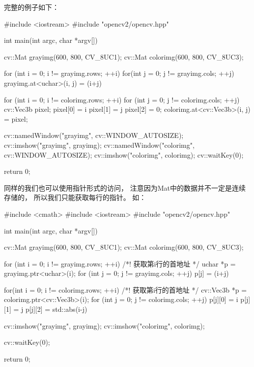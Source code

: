 完整的例子如下：
\begin{cppcode}
  #include <iostream>
  #include "opencv2/opencv.hpp"

  int main(int argc, char *argv[]){
    cv::Mat grayimg(600, 800, CV_8UC1);
    cv::Mat colorimg(600, 800, CV_8UC3);

    for (int i = 0; i != grayimg.rows; ++i){
      for(int j = 0; j != grayimg.cols; ++j){
        grayimg.at<uchar>(i, j) = (i+j)%
      }
    }

    for (int i = 0; i != colorimg.rows; ++i){
      for (int j = 0; j != colorimg.cols; ++j){
        cv::Vec3b pixel;
        pixel[0] = i %
        pixel[1] = j %
        pixel[2] = 0;     
        colorimg.at<cv::Vec3b>(i, j) = pixel;
      }
    }

    cv::namedWindow("grayimg", cv::WINDOW_AUTOSIZE);
    cv::imshow("grayimg", grayimg);
    cv::namedWindow("colorimg", cv::WINDOW_AUTOSIZE);
    cv::imshow("colorimg", colorimg);
    cv::waitKey(0);
    
    return 0;
  }
\end{cppcode}
同样的我们也可以使用指针形式的访问，%
注意因为Mat中的数据并不一定是连续存储的，%
所以我们只能获取每行的指针。%
如：
\begin{cppcode}
  #include <cmath>
  #include <iostream>
  #include "opencv2/opencv.hpp"
  
  int main(int argc, char *argv[]){
    cv::Mat grayimg(600, 800, CV_8UC1);
    cv::Mat colorimg(600, 800, CV_8UC3);
    
    for (int i = 0; i != grayimg.rows; ++i){
      /*! 获取第i行的首地址 */
      uchar *p = grayimg.ptr<uchar>(i);
      for (int j = 0; j != grayimg.cols; ++j){
        p[j] = (i+j)%
      }
    }

    for(int i = 0; i != colorimg.rows; ++i){
      /*! 获取第i行的首地址 */
      cv::Vec3b *p = colorimg.ptr<cv::Vec3b>(i);
      for (int j = 0; j != colorimg.cols; ++j){
        p[j][0] = i %
        p[j][1] = j %
        p[j][2] = std::abs(i-j) %
      }
    }
    
    cv::imshow("grayimg", grayimg);
    cv::imshow("colorimg", colorimg);
    
    cv::waitKey(0);
    
    return 0;
  } 
\end{cppcode}

